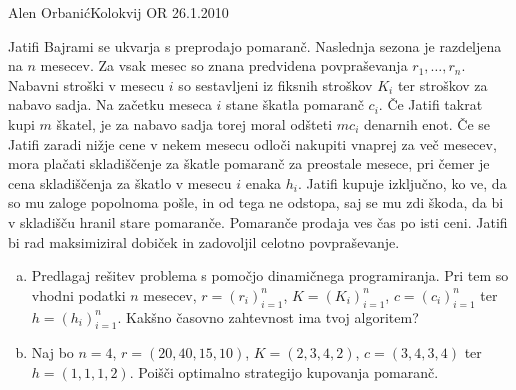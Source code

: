 \begin{naloga}{Alen Orbanić}{Kolokvij OR 26.1.2010}
\begin{vprasanje}
Jatifi Bajrami se ukvarja s preprodajo pomaranč.
Naslednja sezona je razdeljena na $n$ mesecev.
Za vsak mesec so znana predvidena povpraševanja $r_1, \dots, r_n$.
Nabavni stroški v mesecu $i$ so sestavljeni iz fiksnih stroškov $K_i$
ter stroškov za nabavo sadja.
Na začetku meseca $i$ stane škatla pomaranč $c_i$.
Če Jatifi takrat kupi $m$ škatel,
je za nabavo sadja torej moral odšteti $mc_i$ denarnih enot.
Če se Jatifi zaradi nižje cene v nekem mesecu
odloči nakupiti vnaprej za več mesecev,
mora plačati skladiščenje za škatle pomaranč za preostale mesece,
pri čemer je cena skladiščenja za škatlo v mesecu $i$ enaka $h_i$.
Jatifi kupuje izključno, ko ve, da so mu zaloge popolnoma pošle,
in od tega ne odstopa, saj se mu zdi škoda,
da bi v skladišču hranil stare pomaranče.
Pomaranče prodaja ves čas po isti ceni.
Jatifi bi rad maksimiziral dobiček in zadovoljil celotno povpraševanje.

\begin{enumerate}[(a)]
\item Predlagaj rešitev problema s pomočjo dinamičnega programiranja.
Pri tem so vhodni podatki $n$ mesecev, $r = (r_i)_{i=1}^n$,
$K = (K_i)_{i=1}^n$, $c = (c_i)_{i=1}^n$ ter $h = (h_i)_{i=1}^n$.
Kakšno časovno zahtevnost ima tvoj algoritem?

\item Naj bo $n = 4$, $r = (20, 40, 15, 10)$, $K = (2, 3, 4, 2)$,
$c = (3, 4, 3, 4)$ ter $h = (1, 1, 1, 2)$.
Poišči optimalno strategijo kupovanja pomaranč.
\end{enumerate}
\end{vprasanje}
\begin{odgovor}
\end{odgovor}
\end{naloga}
